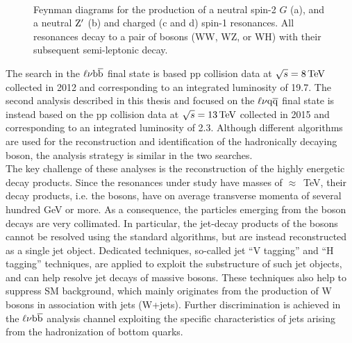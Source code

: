 \begin{figure}[!htb]
\centering
{}\hspace{1cm}
\\
\hspace{1cm}
\caption{Feynman diagrams for the production of a neutral spin-2 $G$ (a), and a neutral $\mathrm{Z}^\prime$ (b) and charged \Wpr (c and d) spin-1 resonances.
All resonances decay to a pair of bosons (WW, WZ, or WH) with their subsequent semi-leptonic decay.}
\label{fig:FDsignals}
\end{figure}

The search in the $\ell\nu{\mathrm{b}\overline{\mathrm{b}}}$ final state is based pp collision data at $\sqrt{s} = 8\,\text{Te\hspace{-.08em}V}$ collected in 2012 and corresponding to an integrated luminosity of 19.7\fbinv.
The second analysis described in this thesis and focused on the $\ell\nu\mathrm{q}\overline{\mathrm{q}}$ final state is instead based on the pp collision data at $\sqrt{s} = 13\,\text{Te\hspace{-.08em}V}$ collected in 2015 and corresponding to an integrated luminosity of 2.3\fbinv.
Although different algorithms are used for the reconstruction and identification of the hadronically decaying boson, the analysis strategy is similar in the two searches.\\

The key challenge of these analyses is the reconstruction of the highly energetic decay products.
Since the resonances under study have masses of $\approx$~TeV, their decay products, i.e. the bosons,
have on average transverse momenta of several hundred GeV or more.
As a consequence, the particles emerging from the boson decays are very collimated.
In particular, the jet-decay products of the bosons cannot be resolved using the standard algorithms,
but are instead reconstructed as a single jet object. Dedicated techniques, so-called jet ``V tagging'' and ``H tagging'' techniques,
are applied to exploit the substructure of such jet objects, and can help resolve jet decays of massive bosons.
These techniques also help to suppress SM background, which mainly originates from the production of W bosons in association with jets (W+jets).
Further discrimination is achieved in the $\ell\nu{\mathrm{b}\overline{\mathrm{b}}}$ analysis channel exploiting the specific characteristics of jets arising from the hadronization of bottom quarks.\\

